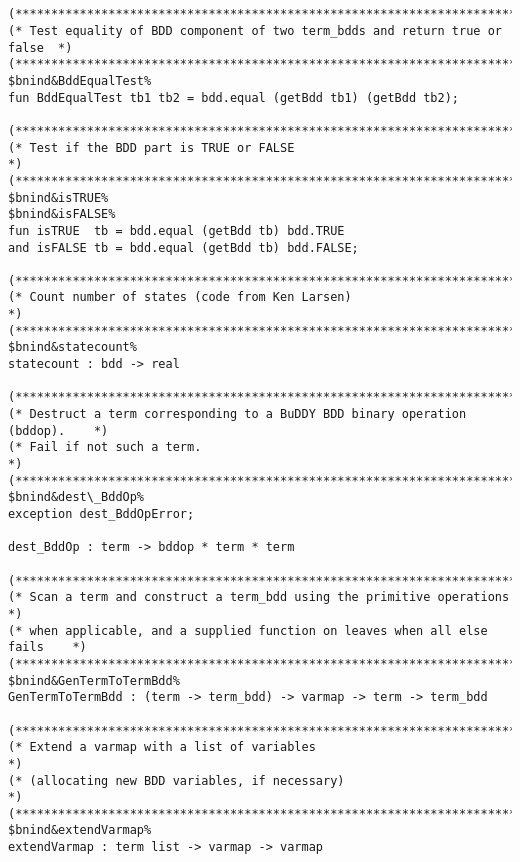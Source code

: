 \documentclass[12pt]{article}
\begin{document}
\begin{footnotesize}
\begin{Verbatim}[commandchars=\$\&\%]


(*****************************************************************************)
(* Test equality of BDD component of two term_bdds and return true or false  *)
(*****************************************************************************)
$bnind&BddEqualTest%
fun BddEqualTest tb1 tb2 = bdd.equal (getBdd tb1) (getBdd tb2);

(*****************************************************************************)
(* Test if the BDD part is TRUE or FALSE                                     *)
(*****************************************************************************)
$bnind&isTRUE%
$bnind&isFALSE%
fun isTRUE  tb = bdd.equal (getBdd tb) bdd.TRUE
and isFALSE tb = bdd.equal (getBdd tb) bdd.FALSE;

(*****************************************************************************)
(* Count number of states (code from Ken Larsen)                             *)
(*****************************************************************************)
$bnind&statecount%
statecount : bdd -> real

(*****************************************************************************)
(* Destruct a term corresponding to a BuDDY BDD binary operation (bddop).    *)
(* Fail if not such a term.                                                  *)
(*****************************************************************************)
$bnind&dest\_BddOp%
exception dest_BddOpError;

dest_BddOp : term -> bddop * term * term

(*****************************************************************************)
(* Scan a term and construct a term_bdd using the primitive operations       *)
(* when applicable, and a supplied function on leaves when all else fails    *)
(*****************************************************************************)
$bnind&GenTermToTermBdd%
GenTermToTermBdd : (term -> term_bdd) -> varmap -> term -> term_bdd

(*****************************************************************************)
(* Extend a varmap with a list of variables                                  *)
(* (allocating new BDD variables, if necessary)                              *)
(*****************************************************************************)
$bnind&extendVarmap%
extendVarmap : term list -> varmap -> varmap






\end{Verbatim}
\end{footnotesize}
\end{document}
